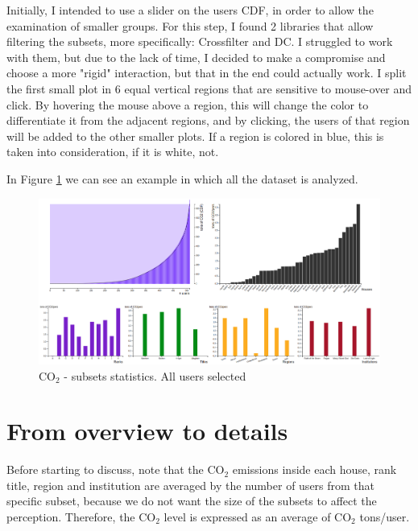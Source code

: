 \documentclass{article}
\begin{document}
Initially, I intended to use a slider on the users CDF, in order to allow the examination of smaller groups. For this step, I found 2 libraries that allow filtering the subsets, more specifically: Crossfilter\cite{crossfilter} and DC\cite{dc}. I struggled to work with them, but due to the lack of time, I decided to make a compromise and choose a more "rigid" interaction, but that in the end could actually work. I split the first small plot in 6 equal vertical regions that are sensitive to mouse-over and click. By hovering the mouse above a region, this will change the color to differentiate it from the adjacent regions, and by clicking, the users of that region will be added to the other smaller plots. If a region is colored in blue, this is taken into consideration, if it is white, not. 


In Figure \ref{fig:vis_1} we can see an example in which all the dataset is analyzed.

\begin{figure}[H]
	\centering
	\includegraphics[scale=0.28]{img/ceo2.png}
	\caption{CO${_2}$ - subsets statistics. All users selected}
	\label{fig:vis_1}
\end{figure}

\section{From overview to details}

Before starting to discuss, note that the CO$_2$ emissions inside each house, rank title, region and institution are averaged by the number of users from that specific subset, because we do not want the size of the subsets to affect the perception. Therefore, the CO$_2$ level is expressed as an average of CO$_2$ tons/user.
\end{document}
